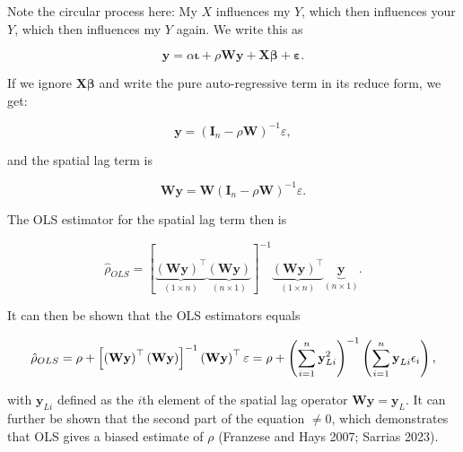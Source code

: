 \documentclass[
  letterpaper,
  DIV=11,
  numbers=noendperiod]{scrreprt}
\begin{document}
Note the circular process here: My \(X\) influences my \(Y\), which then
influences your \(Y\), which then influences my \(Y\) again. We write
this as

\[
    \begin{equation} 
        {\boldsymbol{\mathbf{y}}}=\alpha{\boldsymbol{\mathbf{\iota}}}+\rho{\boldsymbol{\mathbf{W}}}{\boldsymbol{\mathbf{y}}}+{\boldsymbol{\mathbf{X}}}{\boldsymbol{\mathbf{\beta}}}+ {\boldsymbol{\mathbf{\varepsilon}}}.
        \end{equation}  
\]

If we ignore \({\boldsymbol{\mathbf{X}}}{\boldsymbol{\mathbf{\beta}}}\)
and write the pure auto-regressive term in its reduce form, we get:

\[
\boldsymbol{\mathbf{y}} =\left(\boldsymbol{\mathbf{I}}_n - \rho\boldsymbol{\mathbf{W}}\right)^{-1}\varepsilon,
\]

and the spatial lag term is

\[
\boldsymbol{\mathbf{W}} \boldsymbol{\mathbf{y}} =\boldsymbol{\mathbf{W}}\left(\boldsymbol{\mathbf{I}}_n - \rho\boldsymbol{\mathbf{W}}\right)^{-1}\varepsilon.
\]

The OLS estimator for the spatial lag term then is

\[
\hat{\rho}_{OLS} = \left[\underbrace{\left(\boldsymbol{\mathbf{W}}\boldsymbol{\mathbf{y}} \right)^\top}_{(1\times n)}\underbrace{\left(\boldsymbol{\mathbf{W}}\boldsymbol{\mathbf{y}} \right)}_{(n\times 1)}\right]^{-1}\underbrace{\left(\boldsymbol{\mathbf{W}}\boldsymbol{\mathbf{y}} \right)^\top}_{(1\times n)}\underbrace{\boldsymbol{\mathbf{y}}}_{(n\times 1)}.
\]

It can then be shown that the OLS estimators equals

\[
          \hat{\rho}_{OLS} = \rho + \left[\left(\boldsymbol{\mathbf{W}}\boldsymbol{\mathbf{y}} \right)^\top\left(\boldsymbol{\mathbf{W}}\boldsymbol{\mathbf{y}} \right)\right]^{-1}\left(\boldsymbol{\mathbf{W}}\boldsymbol{\mathbf{y}} \right)^\top\varepsilon \\
                                = \rho + \left(\sum_{i = 1}^n \boldsymbol{\mathbf{y}}_{Li}^2\right)^{-1}\left(\sum_{i = 1}^{n}\boldsymbol{\mathbf{y}}_{Li}\epsilon_i\right),
\]

with \(\boldsymbol{\mathbf{y}}_{Li}\) defined as the \(i\)th element of
the spatial lag operator
\(\boldsymbol{\mathbf{W}}\boldsymbol{\mathbf{y}} = \boldsymbol{\mathbf{y}}_L\).
It can further be shown that the second part of the equation \(\neq 0\),
which demonstrates that OLS gives a biased estimate of \(\rho\)
(Franzese and Hays 2007; Sarrias 2023).
\end{document}
